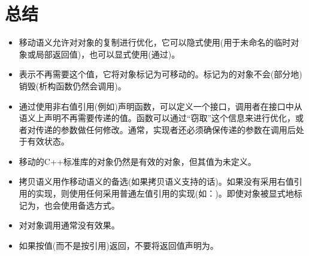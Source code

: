 \section{总结}
\begin{itemize}
	\item 移动语义允许对对象的复制进行优化，它可以隐式使用(用于未命名的临时对象或局部返回值)，也可以显式使用(通过)。
	\item {}表示不再需要这个值，它将对象标记为可移动的。标记为的对象不会(部分地)销毁(析构函数仍然会调用)。
	\item 通过使用非右值引用(例如)声明函数，可以定义一个接口，调用者在接口中从语义上声明不再需要传递的值。函数可以通过“窃取”这个信息来进行优化，或者对传递的参数做任何修改。通常，实现者还必须确保传递的参数在调用后处于有效状态。
	\item 移动的C++标准库的对象仍然是有效的对象，但其值为未定义。
	\item 拷贝语义用作移动语义的备选(如果拷贝语义支持的话)。如果没有采用右值引用的实现，则使用任何采用普通左值引用的实现(如：)。即使对象被显式地标记为，也会使用备选方式。
	\item 对对象调用通常没有效果。
	\item 如果按值(而不是按引用)返回，不要将返回值声明为。
\end{itemize}

